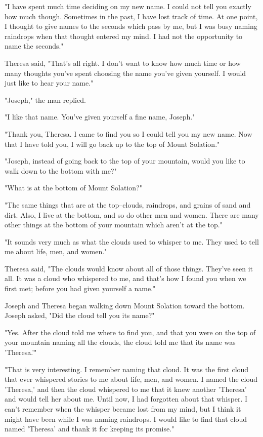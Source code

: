 "I have spent much time deciding on my new name. I could not tell you exactly how much though. Sometimes in the past, I have lost track of time. At one point, I thought to give names to the seconds which pass by me, but I was busy naming raindrops when that thought entered my mind. I had not the opportunity to name the seconds."

Theresa said, "That's all right. I don't want to know how much time or how many thoughts you've spent choosing the name you've given yourself. I would just like to hear your name."

"Joseph," the man replied.

"I like that name. You've given yourself a fine name, Joseph."

"Thank you, Theresa. I came to find you so I could tell you my new name. Now that I have told you, I will go back up to the top of Mount Solation."

"Joseph, instead of going back to the top of your mountain, would you like to walk down to the bottom with me?"

"What is at the bottom of Mount Solation?"

"The same things that are at the top--clouds, raindrops, and grains of sand and dirt. Also, I live at the bottom, and so do other men and women. There are many other things at the bottom of your mountain which aren't at the top."

"It sounds very much as what the clouds used to whisper to me. They used to tell me about life, men, and women."

Theresa said, "The clouds would know about all of those things. They've seen it all. It was a cloud who whispered to me, and that's how I found you when we first met; before you had given yourself a name."

Joseph and Theresa began walking down Mount Solation toward the bottom. Joseph asked, "Did the cloud tell you its name?"

"Yes. After the cloud told me where to find you, and that you were on the top of your mountain naming all the clouds, the cloud told me that its name was 'Theresa.'"

"That is very interesting. I remember naming that cloud. It was the first cloud that ever whispered stories to me about life, men, and women. I named the cloud 'Theresa,' and then the cloud whispered to me that it knew another 'Theresa' and would tell her about me. Until now, I had forgotten about that whisper. I can't remember when the whisper became lost from my mind, but I think it might have been while I was naming raindrops. I would like to find that cloud named 'Theresa' and thank it for keeping its promise."

